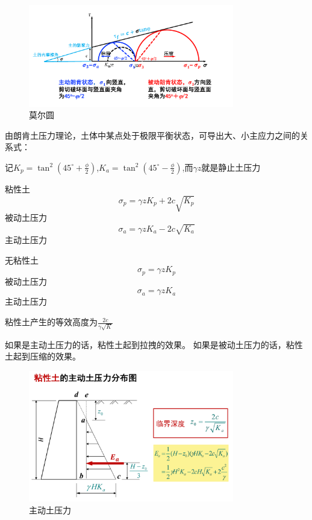\documentclass[12pt, a4paper, oneside, UTF8]{ctexbook}
\begin{document}
\begin{figure}[H]
    \centering
    \includegraphics[width=0.8\textwidth]{../figure/tuceyali.png}
    \caption{莫尔圆}
\end{figure}

\begin{definition}
    由朗肯土压力理论，土体中某点处于极限平衡状态，可导出大、小主应力之间的关系式：

记$K_p = \tan^2 \left( 45^\circ + \frac{\phi}{2} \right)$,$K_a = \tan^2 \left( 45^\circ - \frac{\phi}{2} \right)$,而$\gamma z$就是静止土压力

粘性土
$$
\sigma_p = \gamma z K_p + 2c \sqrt{K_p}
$$
被动土压力
$$
\sigma_a = \gamma z K_a - 2c \sqrt{K_a}
$$
主动土压力

无粘性土
$$
\sigma_p = \gamma z K_p
$$
被动土压力
$$
\sigma_a = \gamma z K_a
$$
主动土压力
\end{definition}

\begin{remark}
    粘性土产生的等效高度为$\frac{2c}{\gamma \sqrt{K}}$

    如果是主动土压力的话，粘性土起到拉拽的效果。
    如果是被动土压力的话，粘性土起到压缩的效果。
\end{remark}

\begin{figure}[H]
    \centering
    \includegraphics[width=0.8\textwidth]{../figure/zhudong.png}
    \caption{主动土压力}
\end{figure}
\end{document}

